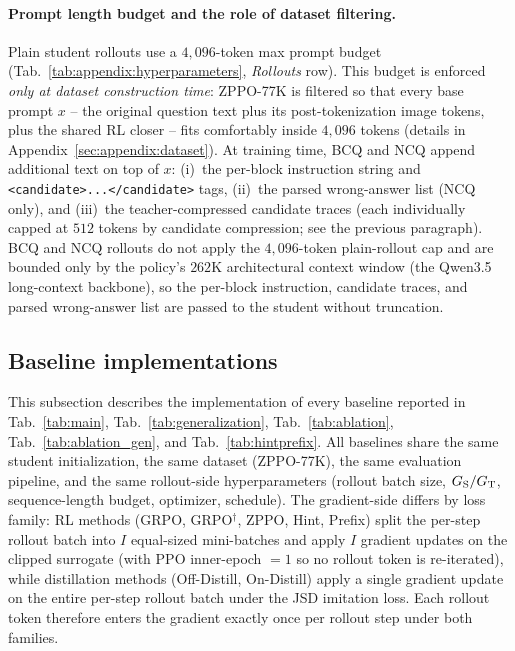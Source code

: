 \documentclass{llmxive}
\begin{document}
\paragraph{Prompt length budget and the role of dataset filtering.}
Plain student rollouts use a $4{,}096$-token max prompt budget (Tab.~\ref{tab:appendix:hyperparameters}, \emph{Rollouts} row). This budget is enforced \emph{only at dataset construction time}: ZPPO-77K is filtered so that every base prompt $x$ -- the original question text plus its post-tokenization image tokens, plus the shared RL closer -- fits comfortably inside $4{,}096$ tokens (details in Appendix~\ref{sec:appendix:dataset}). At training time, BCQ and NCQ append additional text on top of $x$: (i)~the per-block instruction string and \texttt{<candidate>...</candidate>} tags, (ii)~the parsed wrong-answer list (NCQ only), and (iii)~the teacher-compressed candidate traces (each individually capped at $512$ tokens by candidate compression; see the previous paragraph). BCQ and NCQ rollouts do not apply the $4{,}096$-token plain-rollout cap and are bounded only by the policy's $262$K architectural context window (the Qwen3.5 long-context backbone), so the per-block instruction, candidate traces, and parsed wrong-answer list are passed to the student without truncation.

\subsection{Baseline implementations}
\label{sec:appendix:baselines}

This subsection describes the implementation of every baseline reported in Tab.~\ref{tab:main}, Tab.~\ref{tab:generalization}, Tab.~\ref{tab:ablation}, Tab.~\ref{tab:ablation_gen}, and Tab.~\ref{tab:hintprefix}. All baselines share the same student initialization, the same dataset (ZPPO-77K), the same evaluation pipeline, and the same rollout-side hyperparameters (rollout batch size, $G_{\rm S}/G_{\rm T}$, sequence-length budget, optimizer, schedule). The gradient-side differs by loss family: RL methods (GRPO, GRPO$^{\dagger}$, ZPPO, Hint, Prefix) split the per-step rollout batch into $I$ equal-sized mini-batches and apply $I$ gradient updates on the clipped surrogate (with PPO inner-epoch $=1$ so no rollout token is re-iterated), while distillation methods (Off-Distill, On-Distill) apply a single gradient update on the entire per-step rollout batch under the JSD imitation loss. Each rollout token therefore enters the gradient exactly once per rollout step under both families.
\end{document}
